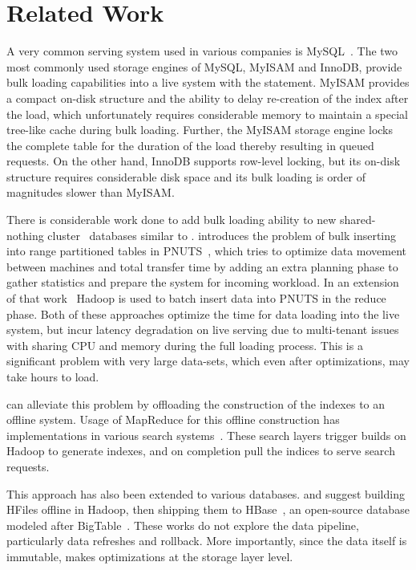 \section{Related Work}
\label{sec:related_work}

A very common serving system used in various companies is
MySQL~\cite{mysql}. The two most commonly used storage engines of
MySQL, MyISAM and InnoDB, provide bulk loading capabilities into a
live system with the  statement. MyISAM provides
a compact on-disk structure and the ability to delay re-creation of
the index after the load, which unfortunately requires considerable
memory to maintain a special tree-like cache during bulk loading.
Further, the MyISAM storage engine locks the complete table for the
duration of the load thereby resulting in queued requests. On the
other hand, InnoDB supports row-level locking, but its on-disk
structure requires considerable disk space and its bulk loading is
order of magnitudes slower than MyISAM. 

There is considerable work done to add bulk loading ability to new
shared-nothing cluster~\cite{sharednothing} databases similar to
\projectname{}. \citet{silberstein} introduces the problem of bulk
inserting into range partitioned tables in PNUTS~\cite{pnuts}, which
tries to optimize data movement between machines and total transfer
time by adding an extra planning phase to gather statistics and
prepare the system for incoming workload. In an extension of that
work~\citet{pnutsbatch} Hadoop is used to batch insert data into PNUTS in
the reduce phase. Both of these approaches optimize the time for data
loading into the live system, but incur latency degradation on live
serving due to multi-tenant issues with sharing CPU and memory during
the full loading process. This is a significant problem with very large
data-sets, which even after optimizations, may take hours to load.  

\projectname{} can alleviate this problem by offloading the
construction of the indexes to an offline system. Usage of MapReduce
for this offline construction has implementations in various
search systems~\cite{dean,mika}.
These search layers trigger builds on Hadoop to generate indexes, and
on completion pull the indices to serve search requests. 

This approach has also been extended to various databases.
\citet{konstantinou} and \citet{barbuzzi} suggest building HFiles
offline in Hadoop, then shipping them to HBase~\cite{hbase}, an
open-source database modeled after BigTable~\cite{bigtable}. These
works do not explore the data pipeline, particularly data refreshes
and rollback. More importantly, since the data itself is immutable,
\projectname{} makes optimizations at the storage layer level.

